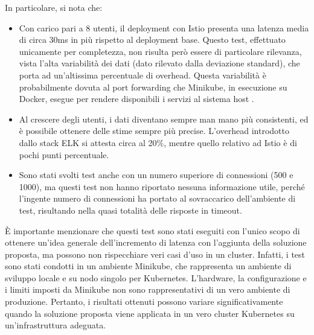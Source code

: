 In particolare, si nota che:
\begin{itemize}
\item Con carico pari a 8 utenti, il deployment con Istio presenta una latenza media di circa 30ms in più rispetto al deployment base. Questo test, effettuato unicamente per completezza, non risulta però essere di particolare rilevanza, vista l'alta variabilità dei dati (dato rilevato dalla deviazione standard), che porta ad un'altissima percentuale di overhead. Questa variabilità è probabilmente dovuta al port forwarding che Minikube, in esecuzione su Docker, esegue per rendere disponibili i servizi al sistema host \cite{ibm_report_docker}.
\item Al crescere degli utenti, i dati diventano sempre man mano più consistenti, ed è possibile ottenere delle stime sempre più precise. L'overhead introdotto dallo stack ELK si attesta circa al 20\%, mentre quello relativo ad Istio è di pochi punti percentuale.
\item Sono stati svolti test anche con un numero superiore di connessioni (500 e 1000), ma questi test non hanno riportato nessuna informazione utile, perché l'ingente numero di connessioni ha portato al sovraccarico dell'ambiente di test, risultando nella quasi totalità delle risposte in timeout.
\end{itemize}

È importante menzionare che questi test sono stati eseguiti con l'unico scopo di ottenere un'idea generale dell'incremento di latenza con l'aggiunta della soluzione proposta, ma possono non rispecchiare veri casi d'uso in un cluster. Infatti, i test sono stati condotti in un ambiente Minikube, che rappresenta un ambiente di sviluppo locale e su nodo singolo per Kubernetes. L'hardware, la configurazione e i limiti imposti da Minikube non sono rappresentativi di un vero ambiente di produzione. Pertanto, i risultati ottenuti possono variare significativamente quando la soluzione proposta viene applicata in un vero cluster Kubernetes su un'infrastruttura adeguata.
